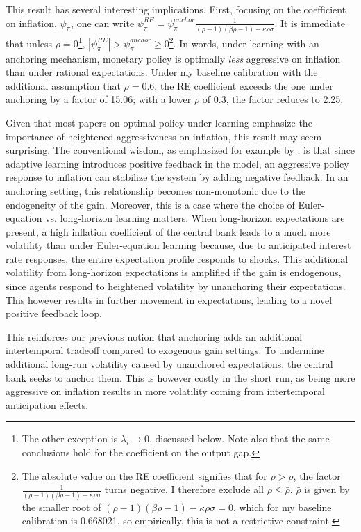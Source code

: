 \documentclass[11pt]{article}
\renewcommand{\[}{\begin{equation}}
\renewcommand{\]}{\end{equation}}
\begin{document}
This result has several interesting implications. First, focusing on the coefficient on inflation, $\psi_{\pi}$, one can write $\psi_{\pi}^{RE} = \psi_{\pi}^{anchor}\frac{1}{(\rho -1) (\beta  \rho -1)-\kappa  \rho  \sigma }$. It is immediate that unless $\rho=0$\footnote{The other exception is $\lambda_i \rightarrow 0$, discussed below. Note also that the same conclusions hold for the coefficient on the output gap.}, $|\psi_{\pi}^{RE}| >\psi_{\pi}^{anchor}\geq 0$\footnote{The absolute value on the RE coefficient signifies that for $\rho > \bar{\rho}$, the factor $\frac{1}{(\rho -1) (\beta  \rho -1)-\kappa  \rho  \sigma }$ turns negative. I therefore exclude all $\rho \leq \bar{\rho}$. $\bar{\rho}$ is given by the smaller root of $(\rho -1) (\beta  \rho -1)-\kappa  \rho  \sigma = 0$, which for my baseline calibration is 0.668021, so empirically, this is not a restrictive constraint.}. In words, under learning with an anchoring mechanism, monetary policy is optimally \emph{less} aggressive on inflation than under rational expectations. Under my baseline calibration with the additional assumption that $\rho=0.6$, the RE coefficient exceeds the one under anchoring by a factor of 15.06; with a lower $\rho$ of 0.3, the factor reduces to 2.25.

Given that most papers on optimal policy under learning emphasize the importance of heightened aggressiveness on inflation, this result may seem surprising. The conventional wisdom, as emphasized for example by \cite{assenza2019managing}, is that since adaptive learning introduces positive feedback in the model, an aggressive policy response to inflation can stabilize the system by adding negative feedback. In an anchoring setting, this relationship becomes non-monotonic due to the endogeneity of the gain. Moreover, this is a case where the choice of Euler-equation vs. long-horizon learning matters. When long-horizon expectations are present, a high inflation coefficient of the central bank leads to a much more volatility than under Euler-equation learning because, due to anticipated interest rate responses, the entire expectation profile responds to shocks. This additional volatility from long-horizon expectations is amplified if the gain is endogenous, since agents respond to heightened volatility by unanchoring their expectations. This however results in further movement in expectations, leading to a novel positive feedback loop.

This reinforces our previous notion that anchoring adds an additional intertemporal tradeoff compared to exogenous gain settings. To undermine additional long-run volatility caused by unanchored expectations, the central bank seeks to anchor them. This is however costly in the short run, as being more aggressive on inflation results in more volatility coming from intertemporal anticipation effects.
\end{document}
